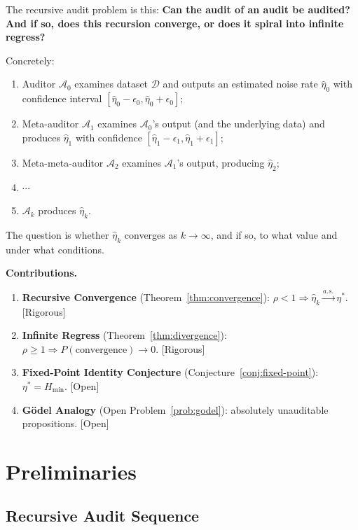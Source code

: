\documentclass[12pt,a4paper]{article}
\newcommand{\rigorous}{\textcolor{green!50!black}{\small\textsf{[Rigorous]}}}
\newcommand{\openquest}{\textcolor{red!70!black}{\small\textsf{[Open]}}}
\newcommand{\cD}{\mathcal{D}}
\newcommand{\cA}{\mathcal{A}}
\begin{document}
The recursive audit problem is this: \textbf{Can the audit of an audit be
audited?  And if so, does this recursion converge, or does it spiral into
infinite regress?}

Concretely:
\begin{enumerate}[label=(\arabic*)]
    \item Auditor $\cA_0$ examines dataset $\cD$ and outputs an estimated
          noise rate $\hat{\eta}_0$ with confidence interval
          $[\hat{\eta}_0-\epsilon_0,\hat{\eta}_0+\epsilon_0]$;
    \item Meta-auditor $\cA_1$ examines $\cA_0$'s output (and the underlying
          data) and produces $\hat{\eta}_1$ with confidence
          $[\hat{\eta}_1-\epsilon_1,\hat{\eta}_1+\epsilon_1]$;
    \item Meta-meta-auditor $\cA_2$ examines $\cA_1$'s output, producing
          $\hat{\eta}_2$;
    \item $\cdots$
    \item $\cA_k$ produces $\hat{\eta}_k$.
\end{enumerate}

The question is whether $\hat{\eta}_k$ converges as $k\to\infty$, and if so,
to what value and under what conditions.

\medskip\noindent
\textbf{Contributions.}
\begin{enumerate}[label=(\arabic*)]
    \item \textbf{Recursive Convergence} (Theorem~\ref{thm:convergence}):
          $\rho<1\Rightarrow\hat{\eta}_k\xrightarrow{a.s.}\eta^*$.  \rigorous
    \item \textbf{Infinite Regress} (Theorem~\ref{thm:divergence}):
          $\rho\geq1\Rightarrow P(\text{convergence})\to0$.  \rigorous
    \item \textbf{Fixed-Point Identity Conjecture}
          (Conjecture~\ref{conj:fixed-point}): $\eta^*=H_{\min}$.
          \openquest
    \item \textbf{G\"odel Analogy} (Open Problem~\ref{prob:godel}):
          absolutely unauditable propositions.  \openquest
\end{enumerate}

\section{Preliminaries}

\subsection{Recursive Audit Sequence}
\end{document}

